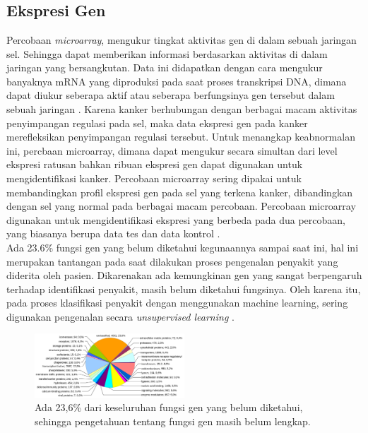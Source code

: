 \chapter{\babDua}

\section{Ekspresi Gen}
Percobaan \textit{microarray}, mengukur tingkat aktivitas gen di dalam sebuah jaringan sel. Sehingga dapat memberikan informasi berdasarkan aktivitas di dalam jaringan yang bersangkutan. Data ini didapatkan dengan cara mengukur banyaknya mRNA yang diproduksi pada saat proses transkripsi DNA, dimana dapat diukur seberapa aktif atau seberapa berfungsinya gen tersebut dalam sebuah jaringan \citep{elloumi2011algorithms}. Karena kanker berhubungan dengan berbagai macam aktivitas penyimpangan regulasi pada sel, maka data ekspresi gen pada kanker merefleksikan penyimpangan regulasi tersebut. Untuk menangkap keabnormalan ini, percbaan microarray, dimana dapat mengukur secara simultan dari level ekspresi ratusan bahkan ribuan ekspresi gen dapat digunakan untuk mengidentifikasi kanker. Percobaan microarray sering dipakai untuk membandingkan profil ekspresi gen pada sel yang terkena kanker, dibandingkan dengan sel yang normal pada berbagai macam percobaan. Percobaan microarray digunakan untuk mengidentifikasi ekspresi yang berbeda pada dua percobaan, yang biasanya berupa data tes dan data kontrol \citep{elloumi2011algorithms}. \\
Ada 23.6\% fungsi gen yang belum diketahui kegunaannya sampai saat ini, hal ini merupakan tantangan pada saat dilakukan proses pengenalan penyakit yang diderita oleh pasien. Dikarenakan ada kemungkinan gen yang sangat berpengaruh terhadap identifikasi penyakit, masih belum diketahui fungsinya. Oleh karena itu, pada proses klasifikasi penyakit dengan menggunakan machine learning, sering digunakan pengenalan secara \textit{unsupervised learning} \citep{haggstrom2014diagram}. \\
\begin{figure}
	\centering
	\includegraphics[width=0.50\textwidth]
		{pics/gbr2_1.png}
	\caption{Ada 23,6\% dari keseluruhan fungsi gen yang belum diketahui, sehingga pengetahuan tentang fungsi gen masih belum lengkap. \citep{haggstrom2014diagram}}
	\label{fig:gbr2.1}
\end{figure}

